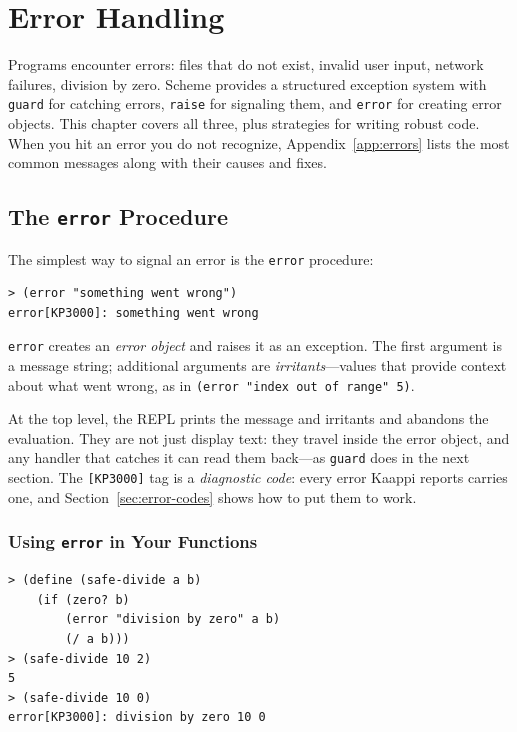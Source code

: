 \chapter{Error Handling}
\label{ch:errors}

Programs encounter errors: files that do not exist, invalid user input, network failures, division by zero. Scheme provides a structured exception system with \texttt{guard} for catching errors, \texttt{raise} for signaling them, and \texttt{error} for creating error objects. This chapter covers all three, plus strategies for writing robust code. When you hit an error you do not recognize, Appendix~\ref{app:errors} lists the most common messages along with their causes and fixes.

\section{The \texttt{error} Procedure}

The simplest way to signal an error is the \texttt{error} procedure:

\begin{lstlisting}[style=repl]
> (error "something went wrong")
error[KP3000]: something went wrong
\end{lstlisting}

\texttt{error} creates an \emph{error object} and raises it as an exception. The first argument is a message string; additional arguments are \emph{irritants}---values that provide context about what went wrong, as in \texttt{(error "index out of range" 5)}.

At the top level, the REPL prints the message and irritants and abandons the evaluation. They are not just display text: they travel inside the error object, and any handler that catches it can read them back---as \texttt{guard} does in the next section. The \texttt{[KP3000]} tag is a \emph{diagnostic code}: every error Kaappi reports carries one, and Section~\ref{sec:error-codes} shows how to put them to work.

\subsection{Using \texttt{error} in Your Functions}

\begin{lstlisting}[style=repl]
> (define (safe-divide a b)
    (if (zero? b)
        (error "division by zero" a b)
        (/ a b)))
> (safe-divide 10 2)
5
> (safe-divide 10 0)
error[KP3000]: division by zero 10 0
\end{lstlisting}

